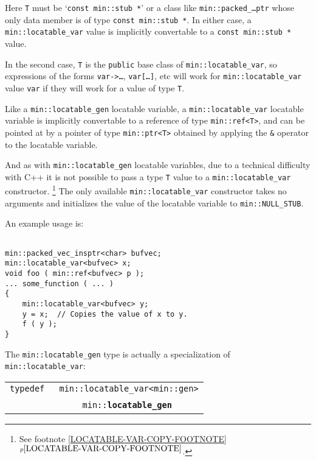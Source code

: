 \documentclass[12pt]{article}
\makeatletter
\newcommand{\ttindex}[1]{\index{#1@{\tt #1}}}
\newcommand{\minindex}[1]{\ttindex{min::#1}\ttindex{#1}}
\newcommand{\itemref}[1]{\ref{#1}$^{p\pageref{#1}}$}
\newcommand{\EOL}{\penalty \exhyphenpenalty}
\newenvironment{indpar}[1][0.3in]%
	{\begin{list}{}%
		     {\setlength{\itemsep}{0in}%
		      \setlength{\topsep}{0in}%
		      \setlength{\parsep}{1ex}%
		      \setlength{\labelwidth}{#1}%
		      \setlength{\leftmargin}{#1}%
		      \addtolength{\leftmargin}{\labelsep}}%
	 \item}%
	{\end{list}}
\newcommand{\LABEL}[1]{\label{#1}}
\newcommand{\ARGBREAK}{\\&{\tt ~~~~}}
\newcommand{\MINKEY}[1]{{\tt \bf #1}\minindex{#1}}
\makeatother
\begin{document}
Here {\tt T} must be
`{\tt const min::stub~*}' or a class like {\tt min::\EOL packed\_\ldots ptr}
whose only data member is of type {\tt const min::stub~*}.
In either case, a {\tt min::\EOL locatable\_\EOL var\TARG}
value is implicitly convertable to a {\tt const min::\EOL stub~*} value.

In the second case, {\tt T} is the {\tt public} base class of
{\tt min::\EOL locatable\_\EOL var\TARG}, so expressions of
the forms {\tt var->\ldots}, {\tt var[\ldots]}, etc will work for
{\tt min::\EOL locatable\_\EOL var\TARG} value {\tt var} if they
will work for a value of type {\tt T}.

Like a {\tt min::\EOL locatable\_\EOL gen} locatable variable,
a {\tt min::\EOL locatable\_\EOL var\TARG} locatable variable
is implicitly convertable to a
reference of type {\tt min::\EOL ref<T>}, and can be pointed at
by a pointer of type {\tt min::\EOL ptr<T>} obtained by applying
the {\tt \&} operator to the locatable variable.

And as with {\tt min::\EOL locatable\_\EOL gen} locatable variables,
due to a technical difficulty with C++ it is not possible to pass a
type {\tt T} value to a {\tt min::\EOL locatable\_\EOL var\TARG} constructor.%
\footnote{See footnote \itemref{LOCATABLE-VAR-COPY-FOOTNOTE}.}
The only available {\tt min::locatable\_var\TARG} constructor takes
no arguments and initializes the value of the locatable variable
to {\tt min::\EOL NULL\_\EOL STUB}.

An example usage is:

\begin{indpar}\begin{verbatim}

min::packed_vec_insptr<char> bufvec;
min::locatable_var<bufvec> x;
void foo ( min::ref<bufvec> p );
... some_function ( ... )
{
    min::locatable_var<bufvec> y;
    y = x;  // Copies the value of x to y.
    f ( y );
}
\end{verbatim}\end{indpar}

The {\tt min::locatable\_gen} type is actually a specialization
of {\tt min::\EOL locatable\_\EOL var}:

\begin{indpar}[0.1in]\begin{tabular}{r@{}l}
\verb|typedef |
	& \verb|min::locatable_var<min::gen>|\ARGBREAK
	  \verb|min::|\MINKEY{locatable\_gen}
\LABEL{MIN::LOCATABLE_GEN_TYPEDEF} \\
\end{tabular}\end{indpar}
\end{document}
